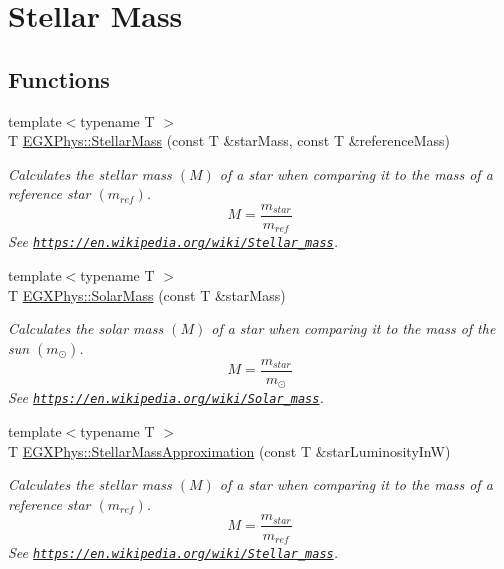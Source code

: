 \hypertarget{group___e_g_x_phys-_stellar_mass}{}\section{Stellar Mass}
\label{group___e_g_x_phys-_stellar_mass}
\subsection*{Functions}
\begin{DoxyCompactItemize}
\item 
{\footnotesize template$<$typename T $>$ }\\T \mbox{\hyperlink{group___e_g_x_phys-_stellar_mass_gabbd6081cd3bfb0153d7470d58f733a61}{E\+G\+X\+Phys\+::\+Stellar\+Mass}} (const T \&star\+Mass, const T \&reference\+Mass)
\begin{DoxyCompactList}\small\item\em Calculates the stellar mass $(M)$ of a star when comparing it to the mass of a reference star $(m_{ref})$. \[M=\frac{m_{star}}{m_{ref}}\] See \href{https://en.wikipedia.org/wiki/Stellar_mass}{\tt https\+://en.\+wikipedia.\+org/wiki/\+Stellar\+\_\+mass}. \end{DoxyCompactList}\item 
{\footnotesize template$<$typename T $>$ }\\T \mbox{\hyperlink{group___e_g_x_phys-_stellar_mass_gac393d64d586be3dc76ac7a98ac336514}{E\+G\+X\+Phys\+::\+Solar\+Mass}} (const T \&star\+Mass)
\begin{DoxyCompactList}\small\item\em Calculates the solar mass $(M)$ of a star when comparing it to the mass of the sun $(m_\odot)$. \[M=\frac{m_{star}}{m_\odot}\] See \href{https://en.wikipedia.org/wiki/Solar_mass}{\tt https\+://en.\+wikipedia.\+org/wiki/\+Solar\+\_\+mass}. \end{DoxyCompactList}\item 
{\footnotesize template$<$typename T $>$ }\\T \mbox{\hyperlink{group___e_g_x_phys-_stellar_mass_gad4da54e02d03fe56e7da736f7d12b42c}{E\+G\+X\+Phys\+::\+Stellar\+Mass\+Approximation}} (const T \&star\+Luminosity\+InW)
\begin{DoxyCompactList}\small\item\em Calculates the stellar mass $(M)$ of a star when comparing it to the mass of a reference star $(m_{ref})$. \[M=\frac{m_{star}}{m_{ref}}\] See \href{https://en.wikipedia.org/wiki/Stellar_mass}{\tt https\+://en.\+wikipedia.\+org/wiki/\+Stellar\+\_\+mass}. \end{DoxyCompactList}\item 

\end{DoxyCompactItemize}
